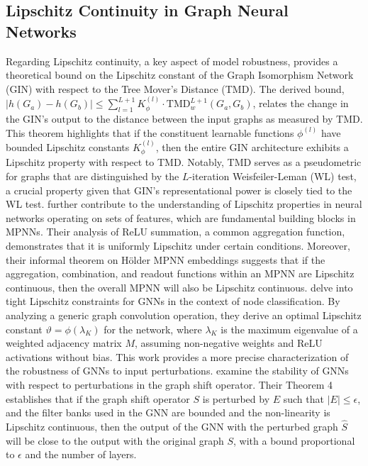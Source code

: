 \subsection{Lipschitz Continuity in Graph Neural Networks}

Regarding Lipschitz continuity, a key aspect of model robustness, \cite{chuang2022tree} provides a theoretical bound on the Lipschitz constant of the Graph Isomorphism Network (GIN) with respect to the Tree Mover’s Distance (TMD). The derived bound, $|h(G_a)-h(G_b)| \le \sum_{l=1}^{L+1} K^{(l)}_{\phi} \cdot \mathrm{TMD}_w^{L+1}(G_a,G_b)$, relates the change in the GIN's output to the distance between the input graphs as measured by TMD. This theorem highlights that if the constituent learnable functions $\phi^{(l)}$ have bounded Lipschitz constants $K^{(l)}_{\phi}$, then the entire GIN architecture exhibits a Lipschitz property with respect to TMD. Notably, TMD serves as a pseudometric for graphs that are distinguished by the $L$-iteration Weisfeiler-Leman (WL) test, a crucial property given that GIN's representational power is closely tied to the WL test. \cite{davidson2024h} further contribute to the understanding of Lipschitz properties in neural networks operating on sets of features, which are fundamental building blocks in MPNNs. Their analysis of ReLU summation, a common aggregation function, demonstrates that it is uniformly Lipschitz under certain conditions. Moreover, their informal theorem on Hölder MPNN embeddings suggests that if the aggregation, combination, and readout functions within an MPNN are Lipschitz continuous, then the overall MPNN will also be Lipschitz continuous. \cite{juvina2024training} delve into tight Lipschitz constraints for GNNs in the context of node classification. By analyzing a generic graph convolution operation, they derive an optimal Lipschitz constant $\vartheta = \phi(\lambda_K)$ for the network, where $\lambda_K$ is the maximum eigenvalue of a weighted adjacency matrix $M$, assuming non-negative weights and ReLU activations without bias. This work provides a more precise characterization of the robustness of GNNs to input perturbations. \cite{gama2020stability} examine the stability of GNNs with respect to perturbations in the graph shift operator. Their Theorem 4 establishes that if the graph shift operator $S$ is perturbed by $E$ such that $|E|\le\epsilon$, and the filter banks used in the GNN are bounded and the non-linearity is Lipschitz continuous, then the output of the GNN with the perturbed graph $\hat{S}$ will be close to the output with the original graph $S$, with a bound proportional to $\epsilon$ and the number of layers.

